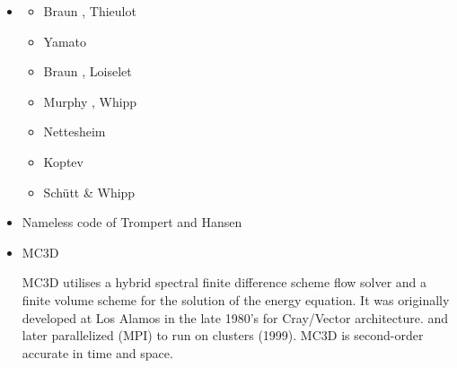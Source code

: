 \begin{itemize}
\item \douar {}

\begin{scriptsize}
\begin{itemize}
\item[\twothousandeight] Braun \etal  \cite{brtf08}, Thieulot \etal  \cite{thfb08}
\item[\twothousandnine] Yamato \etal  \cite{yahb09}
\item[\twothousandten] Braun \etal \cite{brya10}, Loiselet \etal \cite{lobh10}
\item[\twothousandfourteen] Murphy \etal \cite{mutg14}, Whipp \etal \cite{whbb14}
\item[\twothousandeighteen] Nettesheim \etal \cite{neew18}
\item[\twothousandnineteen] Koptev \etal \cite{koen19}
\item[\twothousandtwenty] Sch{\"u}tt \& Whipp \cite{scwh20}
\end{itemize}
\end{scriptsize} 

\item Nameless code of Trompert and Hansen

\begin{scriptsize}
\cite{trha96}
\cite{trha98}\cite{trha98b}
\cite{goch04}
\cite{losh06}
\cite{loha08}\cite{stha08}
\cite{stfh10}
\cite{stlh13}
\cite{stha13}
\cite{stha14}
\end{scriptsize} 

\item MC3D 

MC3D utilises a hybrid spectral finite difference scheme flow
solver and a finite volume scheme for the solution of the energy equation.
It was originally developed at Los Alamos in the late 1980’s for Cray/Vector architecture. 
and later parallelized (MPI) to run on clusters (1999).
MC3D is second-order accurate in time and space.


\end{itemize}
